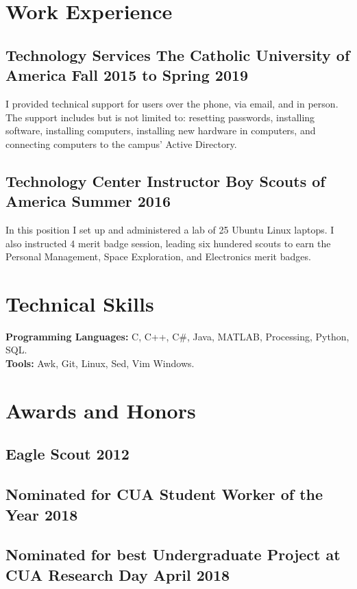 \documentclass{article}
\begin{document}
\section{Work Experience}
\subsection{Technology Services \hspace {60pt}The Catholic University of America \hfill Fall 2015 to Spring 2019}
\justify
I provided technical support for users over the phone, via email, and in person.
The support includes but is not limited to:
resetting passwords,
installing software,
installing computers,
installing new hardware in computers,
and
connecting computers to the campus' Active Directory.
\subsection{Technology Center Instructor \hspace {40pt} Boy Scouts of America \hfill Summer 2016}
\justify
In this position I set up and administered a lab of 25 Ubuntu Linux laptops.
I also instructed 4 merit badge session, leading six hundered scouts to earn the
Personal Management,
Space Exploration,
and
Electronics
merit badges.

\section{Technical Skills}
\textbf{Programming Languages:}
C,
C++,
C\#,
Java,
MATLAB,
Processing,
Python,
SQL.\\
\textbf{Tools:}
Awk,
Git,
Linux,
Sed,
Vim
Windows.

\section{Awards and Honors}
\subsection{Eagle Scout \hfill 2012}
\subsection{Nominated for CUA Student Worker of the Year \hfill 2018}
\subsection{Nominated for best Undergraduate Project at CUA Research Day \hfill April 2018}
\end{document}
